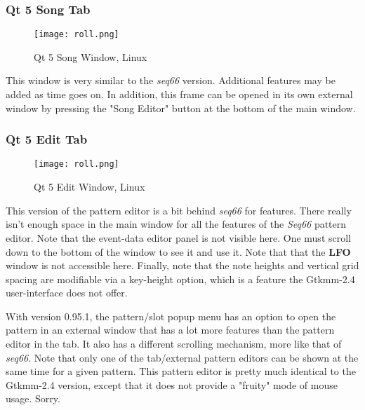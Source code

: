 \subsubsection{Qt 5 Song Tab}
\label{subsubsec:qt_portmidi_qt5_song_tab}

\begin{figure}[H]
   \centering 
   \texttt{[image: roll.png]}
   \caption{Qt 5 Song Window, Linux}
   \label{fig:qt5_song_window_linux}
\end{figure}

   This window is very similar to the \textsl{seq66} version.
   Additional features may be added as time goes on.  In addition,
   this frame can be opened in its own external window by
   pressing the "Song Editor" button at the bottom of the main window.

\subsubsection{Qt 5 Edit Tab}
\label{subsubsec:qt_portmidi_qt5_edit_tab}

\begin{figure}[H]
   \centering 
   \texttt{[image: roll.png]}
   \caption{Qt 5 Edit Window, Linux}
   \label{fig:qt5_edit_window_linux}
\end{figure}

   This version of the pattern editor is a bit behind
   \textsl{seq66} for features.  There really isn't enough space in the
   main window for all the features of the \textsl{Seq66} pattern editor.
   Note that the event-data editor panel is not visible here.
   One must scroll down to the bottom of the window to see it and use it.
   Note that that the \textbf{LFO} window is not accessible here.
   Finally, note that the note heights and vertical grid spacing are
   modifiable via a key-height option, which is a feature the Gtkmm-2.4
   user-interface does not offer.

   With version 0.95.1, the pattern/slot popup menu has an option to open the
   pattern in an external window that has a lot more features than the
   pattern editor in the tab.  It also has a different scrolling mechanism,
   more like that of \textsl{seq66}.
   Note that only one of the tab/external pattern
   editors can be shown at the same time for a given pattern.
   This pattern editor is pretty much identical to the Gtkmm-2.4 version,
   except that it does not provide a "fruity" mode of mouse usage.
   Sorry.

